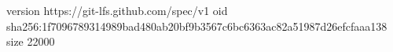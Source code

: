 version https://git-lfs.github.com/spec/v1
oid sha256:1f7096789314989bad480ab20bf9b3567c6bc6363ac82a51987d26efcfaaa138
size 22000
